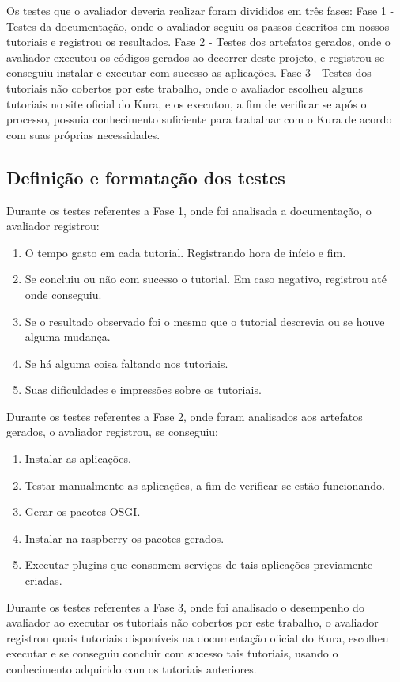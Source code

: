 Os testes que o avaliador deveria realizar foram divididos em três fases: Fase 1 - Testes da documentação, onde o avaliador seguiu os passos descritos em nossos tutoriais e registrou os resultados. Fase 2 - Testes dos artefatos gerados, onde o avaliador executou os códigos gerados ao decorrer deste projeto, e registrou se conseguiu instalar e executar com sucesso as aplicações. Fase 3 - Testes dos tutoriais não cobertos por este trabalho, onde o avaliador escolheu alguns tutoriais no site oficial do Kura, e os executou, a fim de verificar se após o processo, possuia conhecimento suficiente para trabalhar com o Kura de acordo com suas próprias necessidades.

\subsection{Definição e formatação dos testes}

Durante os testes referentes a Fase 1, onde foi analisada a documentação, o avaliador registrou:

\begin{enumerate}
  \item O tempo gasto em cada tutorial. Registrando hora de início e fim.
  \item Se concluiu ou não com sucesso o tutorial. Em caso negativo, registrou até onde conseguiu.
  \item Se o resultado observado foi o mesmo que o tutorial descrevia ou se houve alguma mudança.
  \item Se há alguma coisa faltando nos tutoriais.
  \item Suas dificuldades e impressões sobre os tutoriais.
\end{enumerate}
Durante os testes referentes a Fase 2, onde foram analisados aos artefatos gerados, o avaliador registrou, se conseguiu:

\begin{enumerate}
  \item Instalar as aplicações.
  \item Testar manualmente as aplicações, a fim de verificar se estão funcionando.
  \item Gerar os pacotes OSGI.
  \item Instalar na raspberry os pacotes gerados.
  \item Executar plugins que consomem serviços de tais aplicações previamente criadas.
\end{enumerate}
Durante os testes referentes a Fase 3, onde foi analisado o desempenho do avaliador ao executar os tutoriais não cobertos por este trabalho, o avaliador registrou quais tutoriais disponíveis na documentação oficial do Kura, escolheu executar e se conseguiu concluir com sucesso tais tutoriais, usando o conhecimento adquirido com os tutoriais anteriores.





